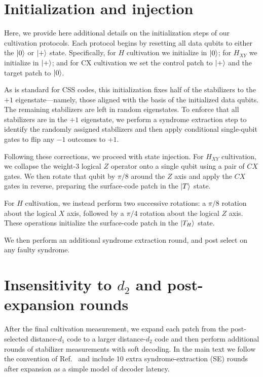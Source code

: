 \documentclass[twocolumn,notitlepage,nofootinbib,floatfix,superscriptaddress]{revtex4-1}
\begin{document}
\section{Initialization and injection}
\label{SI:injection}

Here, we provide here additional details on the initialization steps of our cultivation protocols. Each protocol begins by resetting all data qubits to either the $\ket{0}$ or $\ket{+}$ state. Specifically, for $H$ cultivation we initialize in $\ket{0}$; for $H_{XY}$ we initialize in $\ket{+}$; and for CX cultivation we set the control patch to $\ket{+}$ and the target patch to $\ket{0}$.

As is standard for CSS codes, this initialization fixes half of the stabilizers to the $+1$ eigenstate—namely, those aligned with the basis of the initialized data qubits. The remaining stabilizers are left in random eigenstates. To enforce that all stabilizers are in the $+1$ eigenstate, we perform a syndrome extraction step to identify the randomly assigned stabilizers and then apply conditional single-qubit gates to flip any $-1$ outcomes to $+1$.

Following these corrections, we proceed with state injection. For $H_{XY}$ cultivation, we collapse the weight-3 logical $Z$ operator onto a single qubit using a pair of $CX$ gates. We then rotate that qubit by $\pi/8$ around the $Z$ axis and apply the $CX$ gates in reverse, preparing the surface-code patch in the $\ket{T}$ state.

For $H$ cultivation, we instead perform two successive rotations: a $\pi/8$ rotation about the logical $X$ axis, followed by a $\pi/4$ rotation about the logical $Z$ axis. These operations initialize the surface-code patch in the $\ket{T_H}$ state.

We then perform an additional syndrome extraction round, and post select on any faulty syndrome. 

\section{Insensitivity to $d_2$ and post-expansion rounds}
\label{SI:post_expansion_rounds}

After the final cultivation measurement, we expand each patch from the post-selected distance-$d_1$ code to a larger distance-$d_2$ code and then perform additional rounds of stabilizer measurements with soft decoding. In the main text we follow the convention of Ref.~\cite{gidney2024magic} and include 10 extra syndrome-extraction (SE) rounds after expansion as a simple model of decoder latency.
\end{document}
